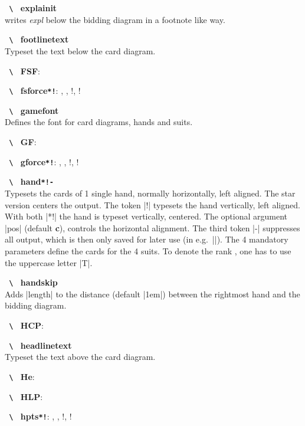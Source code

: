 \documentclass[a4paper,fontsize=11pt,%
  danish,%
  dutch,%
  french,%
  german,%
  norsk,%
  spanish,%
  swedish,%
  turkish,%
  english,%
]{scrartcl}
\newcommand\bs{%
  \texttt{%
    \upshape%
    \textbackslash%
  }%
}%
\let\olditem\item
\renewcommand\item[1][\relax]{\olditem\textbf{\bs#1}}
\newcommand\Oarg[1]{\colorbox{optbackgr}{\texttt{#1}}}
\begin{document}
\begin{description}[itemsep=-0.3em]
\item[explainit]\\
writes \emph{expl} below the bidding diagram in a footnote like way.

\item[footlinetext]\\
Typeset the text below the card diagram.

\item[FSF]: \FSF
\item[fsforce\Oarg{*!}]: \fsforce, \fsforce*, \fsforce!, \fsforce*!

\item[gamefont]\\
Defines the font for card diagrams, hands and suits.

\item[GF]: \GF
\item[gforce\Oarg{*!}]: \gforce, \gforce*, \gforce!, \gforce*!

\item[hand\Oarg{*!-}]\\
Typesets the cards of 1 single hand,
normally horizontally, left aligned. The star version centers the output.
The token |!| typesets the hand vertically, left aligned. With both |*!|
the hand is typeset vertically, centered. The optional argument |pos|
(default \textbf{c}), controls the horizontal alignment. 
The third token |-| suppresses all output, which is then only saved for
later use (in e.g.\ |\expertquiz|). The 4
mandatory parameters define the cards for the 4 suits. To denote the rank
, one has to use the uppercase letter |T|.

\item[handskip]\\
Adds |length| to the distance (default |1em|) between the rightmost hand
and the bidding diagram.

\item[HCP]: \HCP

\item[headlinetext]\\
Typeset the text above the card diagram.

\item[He]: \He

\item[HLP]: \HLP

\item[hpts\Oarg{*!}]: \hpts, \hpts*, \hpts!, \hpts*!


\end{description}
\end{document}
